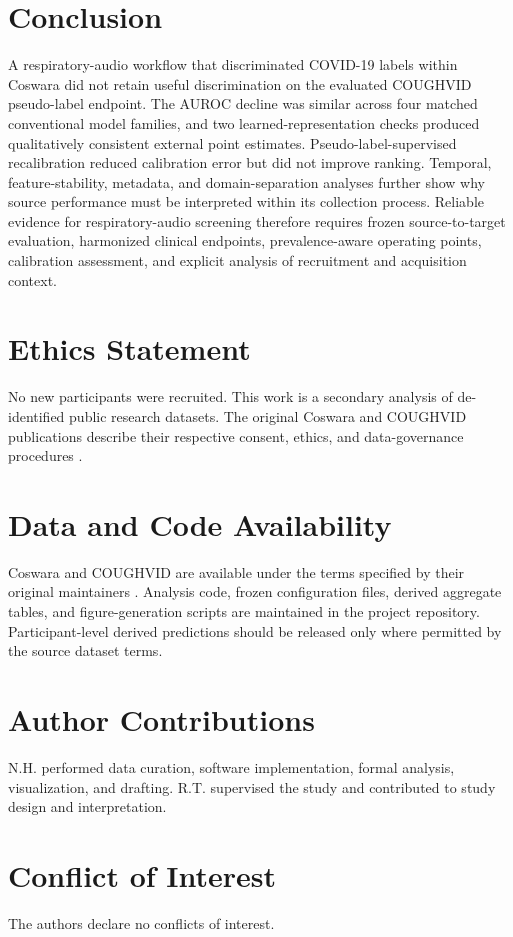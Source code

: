 \documentclass[journal]{IEEEtran}
\begin{document}
\section{Conclusion}

A respiratory-audio workflow that discriminated COVID-19 labels within Coswara did not retain useful discrimination on the evaluated COUGHVID pseudo-label endpoint. The AUROC decline was similar across four matched conventional model families, and two learned-representation checks produced qualitatively consistent external point estimates. Pseudo-label-supervised recalibration reduced calibration error but did not improve ranking. Temporal, feature-stability, metadata, and domain-separation analyses further show why source performance must be interpreted within its collection process. Reliable evidence for respiratory-audio screening therefore requires frozen source-to-target evaluation, harmonized clinical endpoints, prevalence-aware operating points, calibration assessment, and explicit analysis of recruitment and acquisition context.

\section*{Ethics Statement}

No new participants were recruited. This work is a secondary analysis of de-identified public research datasets. The original Coswara and COUGHVID publications describe their respective consent, ethics, and data-governance procedures \cite{bhattacharya2023coswara,orlandic2021coughvid}.

\section*{Data and Code Availability}

Coswara and COUGHVID are available under the terms specified by their original maintainers \cite{bhattacharya2023coswara,orlandic2021coughvid}. Analysis code, frozen configuration files, derived aggregate tables, and figure-generation scripts are maintained in the project repository. Participant-level derived predictions should be released only where permitted by the source dataset terms.

\section*{Author Contributions}

N.H. performed data curation, software implementation, formal analysis, visualization, and drafting. R.T. supervised the study and contributed to study design and interpretation.

\section*{Conflict of Interest}

The authors declare no conflicts of interest.



\end{document}
